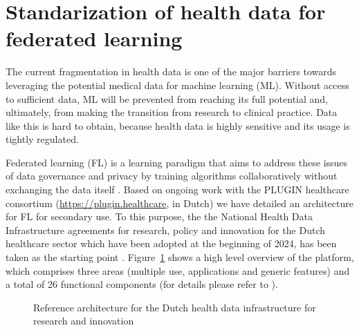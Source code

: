 \documentclass[
  authoryear]{elsarticle}
\begin{document}
\section{Standarization of health data for federated
learning}\label{standarization-of-health-data-for-federated-learning}

The current fragmentation in health data is one of the major barriers
towards leveraging the potential medical data for machine learning (ML).
Without access to sufficient data, ML will be prevented from reaching
its full potential and, ultimately, from making the transition from
research to clinical practice. Data like this is hard to obtain, because
health data is highly sensitive and its usage is tightly regulated.

Federated learning (FL) is a learning paradigm that aims to address
these issues of data governance and privacy by training algorithms
collaboratively without exchanging the data itself
\citep{rieke2020future, teo2024federated}. Based on ongoing work with
the PLUGIN healthcare consortium (\url{https://plugin.healthcare}, in
Dutch) we have detailed an architecture for FL for secondary use. To
this purpose, the the National Health Data Infrastructure agreements for
research, policy and innovation for the Dutch healthcare sector which
have been adopted at the beginning of 2024, has been taken as the
starting point \citep{healthri2024agreements}.
Figure~\ref{fig-healthri-architecture} shows a high level overview of
the platform, which comprises three areas (multiple use, applications
and generic features) and a total of 26 functional components (for
details please refer to \citep{healthri2024agreements}).

\begin{figure}


\caption{\label{fig-healthri-architecture}Reference architecture for the
Dutch health data infrastructure for research and innovation
\citep{healthri2024agreements}}

\end{figure}%
\end{document}
